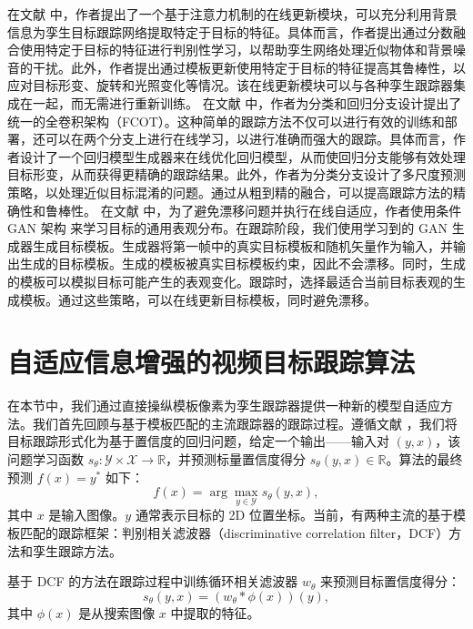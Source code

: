 在文献 \cite{DiscriminativeAnd} 中，作者提出了一个基于注意力机制的在线更新模块，可以充分利用背景信息为孪生目标跟踪网络提取特定于目标的特征。具体而言，作者提出通过分数融合使用特定于目标的特征进行判别性学习，以帮助孪生网络处理近似物体和背景噪音的干扰。此外，作者提出通过模板更新使用特定于目标的特征提高其鲁棒性，以应对目标形变、旋转和光照变化等情况。该在线更新模块可以与各种孪生跟踪器集成在一起，而无需进行重新训练。%
在文献 \cite{FCOT} 中，作者为分类和回归分支设计提出了统一的全卷积架构（FCOT）。这种简单的跟踪方法不仅可以进行有效的训练和部署，还可以在两个分支上进行在线学习，以进行准确而强大的跟踪。具体而言，作者设计了一个回归模型生成器来在线优化回归模型，从而使回归分支能够有效处理目标形变，从而获得更精确的跟踪结果。此外，作者为分类分支设计了多尺度预测策略，以处理近似目标混淆的问题。通过从粗到精的融合，可以提高跟踪方法的精确性和鲁棒性。 %
在文献 \cite{TGGAN} 中，为了避免漂移问题并执行在线自适应，作者使用条件 GAN 架构 \cite{cGAN} 来学习目标的通用表观分布。在跟踪阶段，我们使用学习到的 GAN 生成器生成目标模板。生成器将第一帧中的真实目标模板和随机矢量作为输入，并输出生成的目标模板。生成的模板被真实目标模板约束，因此不会漂移。同时，生成的模板可以模拟目标可能产生的表观变化。跟踪时，选择最适合当前目标表观的生成模板。通过这些策略，可以在线更新目标模板，同时避免漂移。%

\section{自适应信息增强的视频目标跟踪算法}
在本节中，我们通过直接操纵模板像素为孪生跟踪器提供一种新的模型自适应方法。我们首先回顾与基于模板匹配的主流跟踪器的跟踪过程。遵循文献 \cite{Danelljan_2020_CVPR}，我们将目标跟踪形式化为基于置信度的回归问题，给定一个输出——输入对 $(y,x)$，该问题学习函数 $s_\theta:\mathcal{Y\times X\rightarrow \mathbb R}$，并预测标量置信度得分 $s_\theta(y,x)\in\mathbb R$。算法的最终预测 $f(x)=y^*$ 如下：
\begin{equation}
    f(x) = \arg\max_{y\in \mathcal Y}s_\theta (y,x),
\end{equation}
其中 $x$ 是输入图像。$y$ 通常表示目标的 2D 位置坐标。当前，有两种主流的基于模板匹配的跟踪框架：判别相关滤波器（discriminative correlation filter，DCF）方法和孪生跟踪方法。

基于 DCF 的方法在跟踪过程中训练循环相关滤波器 $w_{\theta}$ 来预测目标置信度得分：
\begin{equation}
    s_\theta(y,x)=(w_\theta * \phi(x))(y),
    \label{equ:dcf}
\end{equation}
其中 $\phi(x)$ 是从搜索图像 $x$ 中提取的特征。

